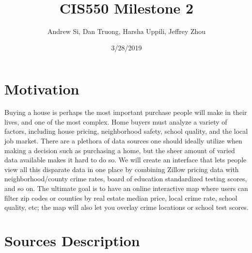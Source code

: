 \documentclass{article}
\title{CIS550 Milestone 2}
\author{Andrew Si, Dan Truong, Harsha Uppili, Jeffrey Zhou}
\date{3/28/2019}
\begin{document}
\maketitle

\section*{Motivation}

Buying a house is perhaps the most important purchase people will make in their lives, and one of the most complex. Home buyers must analyze a variety of factors, including house pricing, neighborhood safety, school quality, and the local job market. There are a plethora of data sources one should ideally utilize when making a decision such as purchasing a home, but the sheer amount of varied data available makes it hard to do so. We will create an interface that lets people view all this disparate data in one place by combining Zillow pricing data with neighborhood/county crime rates, board of education standardized testing scores, and so on. The ultimate goal is to have an online interactive map where users can filter zip codes or counties by real estate median price, local crime rate, school quality, etc; the map will also let you overlay crime locations or school test scores.

\section*{Sources Description}
\end{document}
